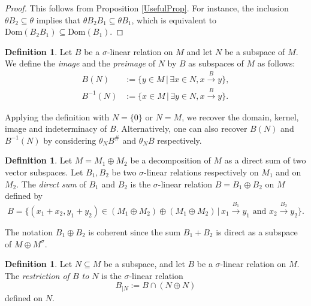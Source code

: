 \documentclass[12pt]{amsart}
\theoremstyle{definition}
\newtheorem{definition}[theorem]{Definition}
\newcommand{\<}{\langle}   %
\renewcommand{\>}{\rangle} %
\begin{document}
\begin{proof}
    This follows from Proposition \ref{UsefulProp}. For instance, the inclusion $\theta B_2 \subseteq  \theta$ implies that $\theta B_2B_1 \subseteq  \theta B_1$, which is equivalent to $\mathrm{Dom}(B_2B_1) \subseteq  \mathrm{Dom}(B_1)$.
\end{proof}

\begin{definition}
    Let $B$ be a $\sigma$-linear relation on $M$ and let $N$ be a subspace of $M$. We define the \textit{image} and the \textit{preimage} of $N$ by $B$ as subspaces of $M$ as follows:
    \begin{align*}
        B(N) & := \{y \in M \,|\, \exists x \in N, x \xrightarrow{B} y \},\\
        B^{-1}(N) & := \{x \in M \,|\, \exists y \in N, x \xrightarrow{B} y \}.
    \end{align*}
\end{definition}

Applying the definition with $N = \{0\}$ or $N = M$, we recover the domain, kernel, image and indeterminacy of $B$. Alternatively, one can also recover $B(N)$ and $B^{-1}(N)$ by considering $\theta_NB^{\#}$ and $\theta_NB$ respectively.

\begin{definition}
    Let $M = M_1 \oplus M_2$ be a decomposition of $M$ as a direct sum of two vector subspaces. Let $B_1,B_2$ be two $\sigma$-linear relations respectively on $M_1$ and on $M_2$. The \textit{direct sum} of $B_1$ and $B_2$ is the $\sigma$-linear relation $B = B_1\oplus B_2$ on $M$ defined by 
    \begin{equation*}
        B = \{(x_1+x_2,y_1+y_2) \in (M_1\oplus M_2)\oplus (M_1 \oplus M_2) \,|\, x_1 \xrightarrow{B_1} y_1 \text{ and } x_2 \xrightarrow{B_2} y_2\}.
    \end{equation*}
\end{definition}

The notation $B_1\oplus B_2$ is coherent since the sum $B_1 + B_2$ is direct as a subspace of $M \oplus M^{\sigma}$.

\begin{definition}
    Let $N \subseteq  M$ be a subspace, and let $B$ be a $\sigma$-linear relation on $M$. The \textit{restriction of $B$ to $N$} is the $\sigma$-linear relation 
    \begin{equation*}
        B_{|N} := B\cap (N\oplus N)
    \end{equation*}
    defined on $N$.
\end{definition}
\end{document}
